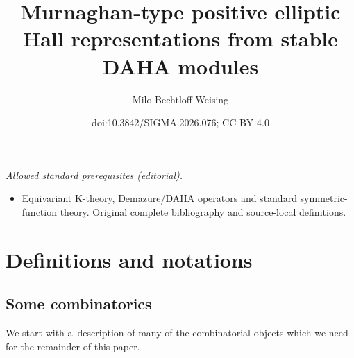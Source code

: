 \documentclass[10pt,a4paper]{amsart}
\title{Murnaghan-type positive elliptic Hall representations from stable DAHA modules}
\author{Milo Bechtloff Weising}
\date{doi:10.3842/SIGMA.2026.076; CC BY 4.0}
\numberwithin{equation}{section}
\theoremstyle{definition}
\begin{document}
\maketitle
\noindent\textit{Allowed standard prerequisites (editorial).}\begin{itemize}
\item Equivariant K-theory, Demazure/DAHA operators and standard symmetric-function theory. Original complete bibliography and source-local definitions.
\end{itemize}\medskip
\section{Definitions and notations}\label{defs and nots}

\subsection{Some combinatorics}

We start with a~description of many of the combinatorial objects which we need for the remainder of this paper.
\end{document}
